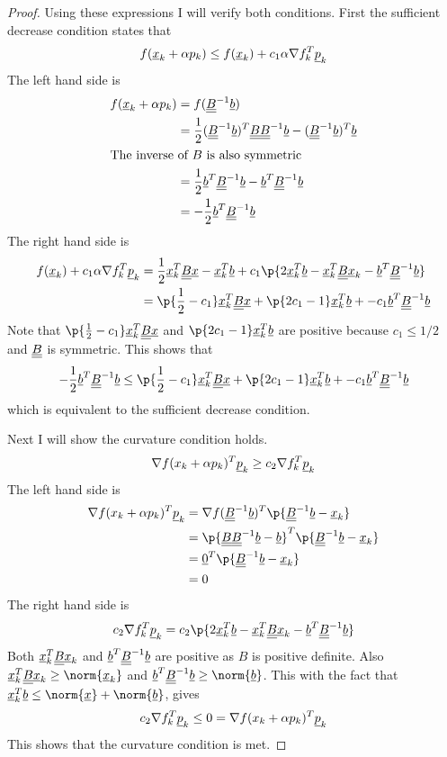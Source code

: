 \documentclass[11pt, oneside]{article}
\begin{document}
\begin{enumerate}
\begin{proof}
      Using these expressions I will verify both conditions.
      First the sufficient decrease condition states that
      \[
        f(\underline{x}_k + \alpha p_k) \le f(\underline{x}_k) + c_1 \alpha \nabla f_k^T \underline{p}_k
      \]
      The left hand side is
      \begin{align*}
        f(\underline{x}_k + \alpha p_k) &= f(\underline{\underline{B}}^{-1} \underline{b}) \\
        &= \frac{1}{2} (\underline{\underline{B}}^{-1} \underline{b})^T \underline{\underline{B}} \underline{\underline{B}}^{-1} \underline{b} - (\underline{\underline{B}}^{-1} \underline{b})^T \underline{b} \\
        \intertext{The inverse of $B$ is also symmetric}
        &= \frac{1}{2} \underline{b}^T \underline{\underline{B}}^{-1} \underline{b} - \underline{b}^T \underline{\underline{B}}^{-1} \underline{b} \\
        &= -\frac{1}{2} \underline{b}^T \underline{\underline{B}}^{-1} \underline{b}
      \end{align*}
      The right hand side is
      \begin{align*}
        f(\v{x}_k) + c_1 \alpha \nabla f_k^T \v{p}_k &= \frac{1}{2}\v{x}_k^T \M{B} \v{x} - \v{x}_k^T \v{b} + c_1\p{2\v{x}_k^T \v{b} - \v{x}_k^T \M{B} \v{x}_k - \v{b}^T \M{B}^{-1} \v{b}} \\
        &=\p{\frac{1}{2} - c_1}\v{x}_k^T \M{B} \v{x} + \p{2c_1 - 1}\v{x}_k^T \v{b} + -c_1\v{b}^T \M{B}^{-1} \v{b}
      \end{align*}
      Note that $\p{\frac{1}{2} - c_1}\v{x}_k^T \M{B} \v{x}$ and $\p{2c_1 - 1}\v{x}_k^T \v{b}$
      are positive because $c_1 \le 1/2$ and $\underline{\underline{B}}$ is symmetric.
      This shows that
      \[
        -\frac{1}{2} \v{b}^T \M{B}^{-1} \v{b} \le \p{\frac{1}{2} - c_1}\v{x}_k^T \M{B} \v{x} + \p{2c_1 - 1}\v{x}_k^T \v{b} + -c_1\v{b}^T \M{B}^{-1} \v{b}
      \]
      which is equivalent to the sufficient decrease condition.

      Next I will show the curvature condition holds.
      \[
        \nabla f(x_k + \alpha p_k)^T \underline{p}_k \ge c_2 \nabla f_k^T \underline{p}_k
      \]
      The left hand side is
      \begin{align*}
        \nabla f(x_k + \alpha p_k)^T \v{p}_k &= \nabla f(\M{B}^{-1} \v{b})^T \p{\M{B}^{-1} \v{b} - \v{x}_k} \\
        &= \p{\M{B} \M{B}^{-1} \v{b} - \v{b}}^T \p{\M{B}^{-1} \v{b} - \v{x}_k} \\
        &= \v{0}^T \p{\M{B}^{-1} \v{b} - \v{x}_k} \\
        &= 0
      \end{align*}
      The right hand side is
      \begin{align*}
        c_2 \nabla f_k^T \v{p}_k &= c_2\p{2\v{x}_k^T \v{b} - \v{x}_k^T \M{B} \v{x}_k - \v{b}^T \M{B}^{-1} \v{b}} \\
      \end{align*}
      Both $\underline{x}_k^T \underline{\underline{B}} \underline{x}_k$ and $\underline{b}^T \underline{\underline{B}}^{-1} \underline{b}$ are
      positive as $B$ is positive definite.
      Also $\v{x}_k^T \M{B} \v{x}_k \ge \norm{\v{x}_k}$ and $\v{b}^T \M{B}^{-1} \v{b} \ge \norm{\v{b}}$.
      This with the fact that $\v{x}_k^T \v{b} \le \norm{\v{x}} + \norm{\v{b}}$, gives
      \[
        c_2 \nabla f_k^T \underline{p}_k \le 0 = \nabla f(x_k + \alpha p_k)^T \underline{p}_k
      \]
      This shows that the curvature condition is met.
    \end{proof}


\end{enumerate}
\end{document}
